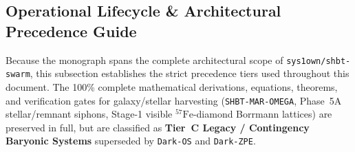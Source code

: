 \documentclass[11pt,onecolumn]{article}
\begin{document}
\subsection{Operational Lifecycle \& Architectural Precedence Guide}
\label{subsec:operational_lifecycle_precedence}

Because the monograph spans the complete architectural scope of \texttt{sys1own/shbt-swarm}, this subsection establishes the strict precedence tiers used throughout this document. The 100\% complete mathematical derivations, equations, theorems, and verification gates for galaxy/stellar harvesting (\texttt{SHBT-MAR-OMEGA}, Phase~5A stellar/remnant siphons, Stage-1 visible $^{57}\text{Fe}$-diamond Borrmann lattices) are preserved in full, but are classified as \textbf{Tier~C Legacy / Contingency Baryonic Systems} superseded by \texttt{Dark-OS} and \texttt{Dark-ZPE}.
\end{document}
